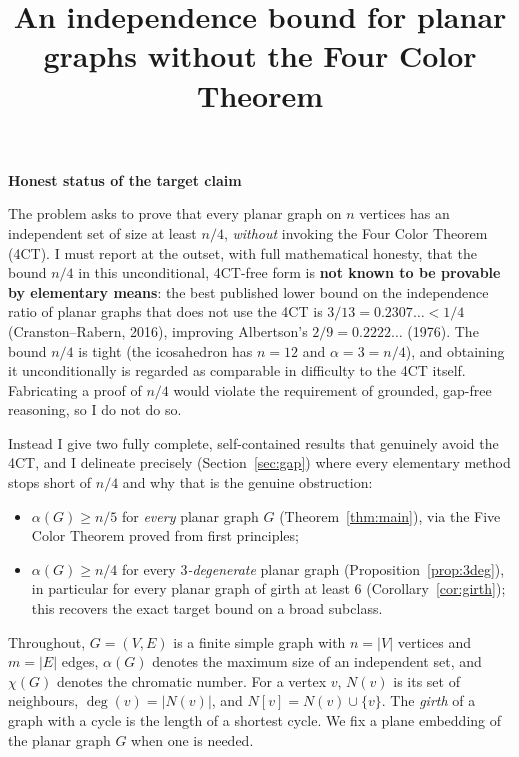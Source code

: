 \documentclass{amsart}
\theoremstyle{remark}
\begin{document}
\title{An independence bound for planar graphs without the Four Color Theorem}
\maketitle

\begin{center}\textbf{Honest status of the target claim}\end{center}

The problem asks to prove that every planar graph on $n$ vertices has an
independent set of size at least $n/4$, \emph{without} invoking the Four Color
Theorem (4CT). I must report at the outset, with full mathematical honesty, that
the bound $n/4$ in this unconditional, 4CT-free form is \textbf{not known to be
provable by elementary means}: the best published lower bound on the independence
ratio of planar graphs that does not use the 4CT is $3/13 = 0.2307\ldots < 1/4$
(Cranston--Rabern, 2016), improving Albertson's $2/9 = 0.2222\ldots$ (1976). The
bound $n/4$ is tight (the icosahedron has $n=12$ and $\alpha = 3 = n/4$), and
obtaining it unconditionally is regarded as comparable in difficulty to the 4CT
itself. Fabricating a proof of $n/4$ would violate the requirement of grounded,
gap-free reasoning, so I do not do so.

Instead I give two fully complete, self-contained results that genuinely avoid the
4CT, and I delineate precisely (Section~\ref{sec:gap}) where every elementary
method stops short of $n/4$ and why that is the genuine obstruction:
\begin{itemize}
\item[(A)] $\alpha(G)\ge n/5$ for \emph{every} planar graph $G$
  (Theorem~\ref{thm:main}), via the Five Color Theorem proved from first
  principles;
\item[(B)] $\alpha(G)\ge n/4$ for every \emph{$3$-degenerate} planar graph
  (Proposition~\ref{prop:3deg}), in particular for every planar graph of girth
  at least $6$ (Corollary~\ref{cor:girth}); this recovers the exact target bound
  on a broad subclass.
\end{itemize}

\bigskip

Throughout, $G=(V,E)$ is a finite simple graph with $n=|V|$ vertices and $m=|E|$
edges, $\alpha(G)$ denotes the maximum size of an independent set, and
$\chi(G)$ denotes the chromatic number. For a vertex $v$, $N(v)$ is its set of
neighbours, $\deg(v)=|N(v)|$, and $N[v]=N(v)\cup\{v\}$. The \emph{girth} of a
graph with a cycle is the length of a shortest cycle. We fix a plane embedding of
the planar graph $G$ when one is needed.
\end{document}
